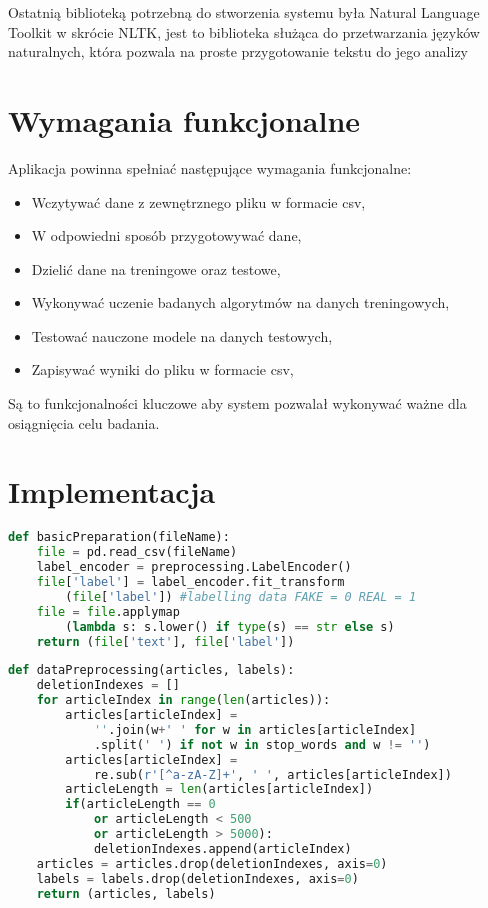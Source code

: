 Ostatnią biblioteką potrzebną do stworzenia systemu była Natural Language Toolkit w skrócie 
NLTK, jest to biblioteka służąca do przetwarzania języków naturalnych, która pozwala na proste przygotowanie tekstu do jego analizy
\section{Wymagania funkcjonalne}
Aplikacja powinna spełniać następujące wymagania funkcjonalne: 
\begin{itemize}
    \item Wczytywać dane z zewnętrznego pliku w formacie csv,
    \item W odpowiedni sposób przygotowywać dane,
    \item Dzielić dane na treningowe oraz testowe,
    \item Wykonywać uczenie badanych algorytmów na danych treningowych,
    \item Testować nauczone modele na danych testowych,
    \item Zapisywać wyniki do pliku w formacie csv,
\end{itemize}
Są to funkcjonalności kluczowe aby system pozwalał wykonywać ważne dla osiągnięcia celu
badania.
\section{Implementacja}
\begin{lstlisting}[language=Python, caption={Funkcja przygotowywująca dane pobrane z pliku csv}, captionpos=b, frame=single]
def basicPreparation(fileName): 
    file = pd.read_csv(fileName)
    label_encoder = preprocessing.LabelEncoder()
    file['label'] = label_encoder.fit_transform
        (file['label']) #labelling data FAKE = 0 REAL = 1
    file = file.applymap
        (lambda s: s.lower() if type(s) == str else s) 
    return (file['text'], file['label'])

\end{lstlisting}

\begin{lstlisting}[language=Python, caption={Funkcja przygotowywująca dane tekstowe}, captionpos=b, frame=single]
def dataPreprocessing(articles, labels):
    deletionIndexes = []
    for articleIndex in range(len(articles)):
        articles[articleIndex] = 
            ''.join(w+' ' for w in articles[articleIndex]
            .split(' ') if not w in stop_words and w != '')  
        articles[articleIndex] = 
            re.sub(r'[^a-zA-Z]+', ' ', articles[articleIndex])
        articleLength = len(articles[articleIndex])
        if(articleLength == 0 
            or articleLength < 500 
            or articleLength > 5000):
            deletionIndexes.append(articleIndex) 
    articles = articles.drop(deletionIndexes, axis=0)
    labels = labels.drop(deletionIndexes, axis=0)
    return (articles, labels)

\end{lstlisting}

